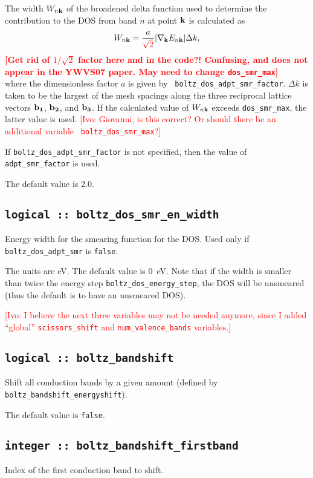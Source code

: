 The width $W_{n{\bf k}}$ of the broadened delta function used to
determine the contribution to the DOS from band $n$ at point ${\bf k}$
is calculated as
%
$$
W_{n{\bf k}}=\frac{a}{\textcolor{red}{\sqrt{2}}}\vert
\nabla_{\bf k} E_{n{\bf k}}\vert \Delta k,
$$ 
%
\textcolor{red}{{\bf [Get rid of $1/\sqrt{2}$ factor here and in the
    code?!  Confusing, and does not appear in the YWVS07 paper. May
    need to change
    {\tt dos\_smr\_max}]}}\\
where the dimensionless factor $a$ is given by {\tt
  boltz\_dos\_adpt\_smr\_factor}. $\Delta k$ is taken to be the
largest of the mesh spacings along the three reciprocal lattice
vectors ${\bf b_1}$, ${\bf b_2}$, and ${\bf b_3}$.  If the calculated
value of $W_{n{\bf k}}$ exceeds {\tt dos\_smr\_max}, the
latter value is used.  \textcolor{red}{[Ivo: Giovanni, is this correct? Or
  should there be an additional variable {\tt
    boltz\_dos\_smr\_max}?]}


If {\tt boltz\_dos\_adpt\_smr\_factor} is not specified, then the value of {\tt
  adpt\_smr\_factor} is used.  

The default value is 2.0.

\subsection[boltz\_dos\_smr\_en\_width]{\tt logical :: boltz\_dos\_smr\_en\_width}
Energy width for the smearing function for the DOS. Used only if {\tt boltz\_dos\_adpt\_smr} is \verb#false#.

The units are eV.
The default value is 0~eV. Note that if the width is smaller than twice the energy step {\tt boltz\_dos\_energy\_step}, the DOS will be unsmeared (thus the default is to have an unsmeared DOS).

\textcolor{red}{[Ivo: I believe the next three variables may not be
  needed anymore, since I added ``global'' {\tt scissors\_shift} and
  {\tt num\_valence\_bands} variables.]}

\subsection[boltz\_bandshift]{\tt logical :: boltz\_bandshift}
Shift all conduction bands by a given amount (defined by {\tt boltz\_bandshift\_energyshift}).

The default value is \verb#false#.

\subsection[boltz\_bandshift\_firstband]{\tt integer :: boltz\_bandshift\_firstband}
Index of the first conduction band to shift.

